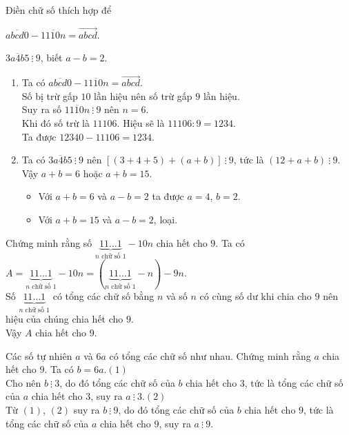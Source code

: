 \begin{bt}%
 Điền chữ số thích hợp để
 \begin{enumEX}{2}
  \item $\overline{abcd0} - \overline{1110n} = \overrightarrow{abcd}$.
  \item $\overline{3a4b5}\ \vdots\ 9$, biết $a-b=2$.
 \end{enumEX}
 \loigiai
  {
  \begin{enumerate}
   \item Ta có $\overline{abcd0} - \overline{1110n} = \overrightarrow{abcd}$.\\
   Số bị trừ gấp $10$ lần hiệu nên số trừ gấp $9$ lần hiệu.\\
   Suy ra số $\overline{1110n}\ \vdots\ 9$ nên $n=6$.\\
   Khi đó số trừ là $11106$. Hiệu sẽ là $11106:9=1234$.\\
   Ta được $12340-11106=1234$.
   \item Ta có $\overline{3a4b5}\ \vdots\ 9$ nên $[(3+4+5)+(a+b)]\ \vdots\ 9$, tức là $(12+a+b)\ \vdots\ 9$.\\
   Vậy $a+b=6$ hoặc $a+b=15$.
   \begin{itemize}
   	\item Với $a+b=6$ và $a-b=2$ ta được $a=4$, $b=2$.
   	\item Với $a+b=15$ và $a-b=2$, loại.
   \end{itemize}
  \end{enumerate}
  }
\end{bt}

\begin{bt}%
 Chứng minh rằng số $\underbrace{11\ldots1}\limits_{n \text{ chữ số } 1} - 10n$ chia hết cho $9$.
 \loigiai
  {
  Ta có $A = \underbrace{11\ldots1}\limits_{n \text{ chữ số } 1} - 10n = \left(\underbrace{11\ldots1}\limits_{n \text{ chữ số } 1} - n\right) - 9n$.\\
  Số $\underbrace{11\ldots1}\limits_{n \text{ chữ số } 1}$ có tổng các chữ số bằng $n$ và số $n$ có cùng số dư khi chia cho $9$ nên hiệu của chúng chia hết cho $9$.\\
  Vậy $A$ chia hết cho $9$.
  }
\end{bt}

\begin{bt}%
 Các số tự nhiên $a$ và $6a$ có tổng các chữ số như nhau. Chứng minh rằng $a$ chia hết cho $9$.
 \loigiai
  {
  Ta có $b=6a$.\hfill$(1)$\\
  Cho nên $b\ \vdots\ 3$, do đó tổng các chữ số của $b$ chia hết cho $3$, tức là tổng các chữ số của $a$ chia hết cho $3$, suy ra $a\ \vdots\ 3$.\hfill$(2)$\\
  Từ $(1)$, $(2)$ suy ra $b\ \vdots\ 9$, do đó tổng các chữ số của $b$ chia hết cho $9$, tức là tổng các chữ số của $a$ chia hết cho $9$, suy ra $a\ \vdots\ 9$.
  }
\end{bt}

